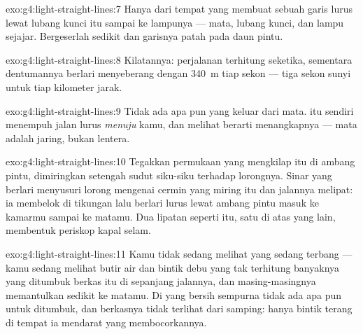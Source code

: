 \begin{solution}{exo:g4:light-straight-lines:7}
Hanya dari tempat yang membuat sebuah garis lurus lewat lubang kunci
itu sampai ke lampunya --- mata, lubang kunci, dan lampu sejajar.
Bergeserlah sedikit dan garisnya patah pada daun pintu.
\end{solution}

\begin{solution}{exo:g4:light-straight-lines:8}
Kilatannya: perjalanan  terhitung seketika, sementara
dentumannya berlari menyeberang dengan \qty{340}{m} tiap sekon ---
tiga sekon sunyi untuk tiap kilometer jarak.
\end{solution}

\begin{solution}{exo:g4:light-straight-lines:9}
Tidak ada apa pun yang keluar dari mata.   itu sendiri
menempuh jalan lurus \emph{menuju} kamu, dan melihat berarti
menangkapnya --- mata adalah jaring, bukan lentera.
\end{solution}

\begin{solution}{exo:g4:light-straight-lines:10}
Tegakkan permukaan yang mengkilap itu di ambang pintu, dimiringkan
setengah sudut siku-siku terhadap lorongnya. Sinar yang berlari
menyusuri lorong mengenai cermin yang miring itu dan jalannya melipat:
ia membelok di tikungan lalu berlari lurus lewat ambang pintu masuk ke
kamarmu sampai ke matamu. Dua lipatan seperti itu, satu di atas yang
lain, membentuk periskop kapal selam.
\end{solution}

\begin{solution}{exo:g4:light-straight-lines:11}
Kamu tidak sedang melihat  yang sedang terbang --- kamu sedang
melihat butir air dan bintik debu yang tak terhitung banyaknya yang
ditumbuk berkas itu di sepanjang jalannya, dan masing-masingnya
memantulkan sedikit  ke matamu. Di  yang bersih sempurna
tidak ada apa pun untuk ditumbuk, dan berkasnya tidak terlihat dari
samping: hanya bintik terang di tempat ia mendarat yang
membocorkannya.
\end{solution}
